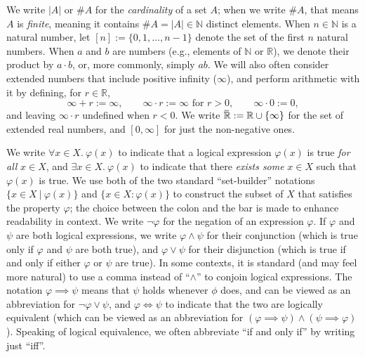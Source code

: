 We write $|A|$ or $\# A$ for the \emph{cardinality} of a set $A$;
    when we write $\#A$, that means $A$ is \emph{finite}, 
    meaning it contains $\#A = |A| \in \mathbb N$ distinct elements. 
When $n \in \mathbb N$ is a natural number, let
    $[n] := \{ 0, 1, \ldots, n-1 \}$ denote the set of the first $n$ natural numbers.
When $a$ and $b$ are numbers (e.g., elements of $\mathbb N$ or $\mathbb R$), we denote their product by $a \cdot b$, or, more commonly, simply $a b$.
We will also often consider extended numbers that include positive infinity ($\infty$), and perform arithmetic with it by defining, for $r \in \mathbb R$,
\[
    \infty + r := \infty,
    \qquad 
    \infty \cdot r := \infty \text{ for }r > 0,
    \qquad
    \infty \cdot 0 := 0,
\]
and leaving $\infty \cdot r$ undefined when $r < 0$. 
We write $\mskip1mu\overline{\mskip-1mu\mathbb R\!}\, := \mathbb R \cup \{\infty\}$ for the set of extended real numbers, and $[0, \infty]$ for just the non-negative ones. 


We write $\forall x \in X.~\varphi(x)$ to indicate that a logical expression $\varphi(x)$ is true \emph{for all} $x \in X$, and $\exists x \in X.~ \varphi(x)$ to indicate that there \emph{exists some} $x \in X$ such that $\varphi(x)$ is true.
We use both of the two standard ``set-builder'' notations 
$\{ x \in X ~|~ \varphi(x) \}$ 
    and
    $\{ x \in X : \varphi(x) \}$ 
    to construct the subset of $X$ that satisfies the property $\varphi$;
    the choice between the colon and the bar is made to enhance readability in context.
We write $\lnot\varphi$ for the negation of an expression $\varphi$. 
If $\varphi$ and $\psi$ are both logical expressions, we write $\varphi \land \psi$ for their conjunction (which is true only if $\varphi$ and $\psi$ are both true), and $\varphi \lor \psi$ for their disjunction (which is true if and only if either $\varphi$ or $\psi$ are true).
In some contexts, it is standard (and may feel more natural) to use a comma instead of ``$\land$'' to conjoin logical expressions. 
The notation $\varphi \implies \psi$ means that $\psi$ holds whenever $\phi$ does, and can be viewed as an abbreviation for $\lnot \varphi \lor \psi$, 
and $\varphi \iff \psi$ to indicate that the two are logically equivalent (which can be viewed as an abbreviation for $(\varphi \implies \psi) \land (\psi \implies \varphi)$).
Speaking of logical equivalence, we often abbreviate ``if and only if'' by writing just ``iff''. 



